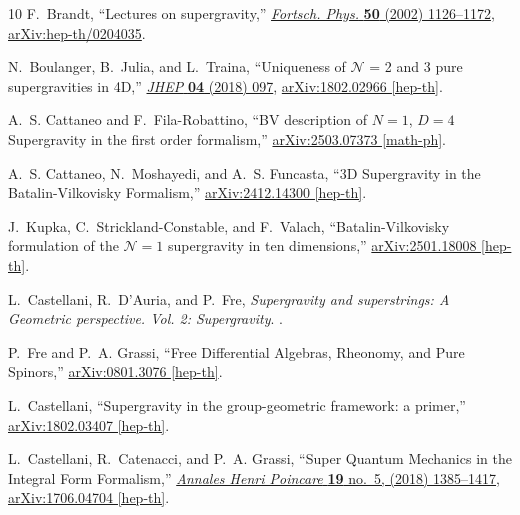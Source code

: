 \documentclass[a4paper,12pt]{article}
\numberwithin{equation}{section} %
\numberwithin{equation}{section}
\begin{document}
\begin{thebibliography}{10}
F.~Brandt, ``{Lectures on supergravity},'' \href{http://dx.doi.org/10.1002/1521-3978(200210)50:10/11<1126::AID-PROP1126>3.0.CO;2-B}{{\em Fortsch. Phys.} {\bfseries 50} (2002) 1126--1172}, \href{http://arxiv.org/abs/hep-th/0204035}{{\ttfamily arXiv:hep-th/0204035}}.

N.~Boulanger, B.~Julia, and L.~Traina, ``{Uniqueness of $ \mathcal{N} $ = 2 and 3 pure supergravities in 4D},'' \href{http://dx.doi.org/10.1007/JHEP04(2018)097}{{\em JHEP} {\bfseries 04} (2018) 097}, \href{http://arxiv.org/abs/1802.02966}{{\ttfamily arXiv:1802.02966 [hep-th]}}.

A.~S. Cattaneo and F.~Fila-Robattino, ``{BV description of $N = 1$, $D = 4$ Supergravity in the first order formalism},'' \href{http://arxiv.org/abs/2503.07373}{{\ttfamily arXiv:2503.07373 [math-ph]}}.

A.~S. Cattaneo, N.~Moshayedi, and A.~S. Funcasta, ``{3D Supergravity in the Batalin-Vilkovisky Formalism},'' \href{http://arxiv.org/abs/2412.14300}{{\ttfamily arXiv:2412.14300 [hep-th]}}.

J.~Kupka, C.~Strickland-Constable, and F.~Valach, ``{Batalin-Vilkovisky formulation of the $\mathcal N=1$ supergravity in ten dimensions},'' \href{http://arxiv.org/abs/2501.18008}{{\ttfamily arXiv:2501.18008 [hep-th]}}.

L.~Castellani, R.~D'Auria, and P.~Fre, {\em {Supergravity and superstrings: A Geometric perspective. Vol. 2: Supergravity}}.
.

P.~Fre and P.~A. Grassi, ``{F}ree {D}ifferential {A}lgebras, {R}heonomy, and {P}ure {S}pinors,''
\href{http://arxiv.org/abs/0801.3076}{{\ttfamily arXiv:0801.3076 [hep-th]}}.

L.~Castellani, ``{Supergravity in the group-geometric framework: a primer},''
\href{http://arxiv.org/abs/1802.03407}{{\ttfamily arXiv:1802.03407 [hep-th]}}.

L.~Castellani, R.~Catenacci, and P.~A. Grassi, ``{Super Quantum Mechanics in the Integral Form Formalism},'' \href{http://dx.doi.org/10.1007/s00023-018-0653-y}{{\em Annales Henri Poincare} {\bfseries 19} no.~5, (2018) 1385--1417}, \href{http://arxiv.org/abs/1706.04704}{{\ttfamily arXiv:1706.04704 [hep-th]}}.


\end{thebibliography}
\end{document}
